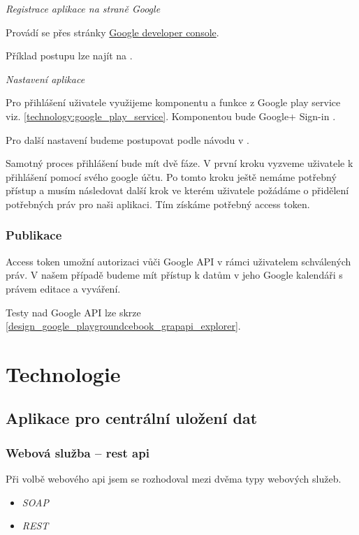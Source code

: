 \documentclass[thesis=B,czech]{FITthesis}[2012/06/26]
\begin{document}
\textit{Registrace aplikace na straně Google}

Provádí se přes stránky \href{''https://console.developers.google.com''}{Google developer console}\cite{design_google_console}.

Příklad postupu lze najít na \cite{design_google_registration}. 

\textit{Nastavení aplikace}

Pro přihlášení uživatele využijeme komponentu a funkce z Google play service viz. \ref{technology:google_play_service}. Komponentou bude Google+ Sign-in \cite{design_google_signin_googleplus}.

Pro další nastavení budeme postupovat podle návodu v \cite{design_facebook_android_login}.

Samotný proces přihlášení bude mít dvě fáze. V první kroku vyzveme uživatele k přihlášení pomocí svého google účtu. Po tomto kroku ještě nemáme potřebný přístup a musím následovat další krok ve kterém uživatele požádáme o přidělení potřebných práv pro naši aplikaci. Tím získáme potřebný access token\cite{design_google_access_token}. 

\subsubsection{Publikace}

Access token umožní autorizaci vůči Google API v rámci uživatelem schválených práv. V našem případě budeme mít přístup k datům v jeho Google kalendáři s právem editace a vyváření.

Testy nad Google API lze skrze \ref{design_google_playgroundcebook_grapapi_explorer}.

 
\section{Technologie}

\subsection{Aplikace pro centrální uložení dat}
  
\subsubsection{Webová služba -- \acrshort{rest} \acrshort{api}}

Při volbě webového \acrshort{api} jsem se rozhodoval mezi dvěma typy webových služeb.
\newline
\begin{itemize}
	\item \textit{SOAP}
	\item \textit{REST}
\end{itemize}
\vspace*{1\baselineskip}
\end{document}
